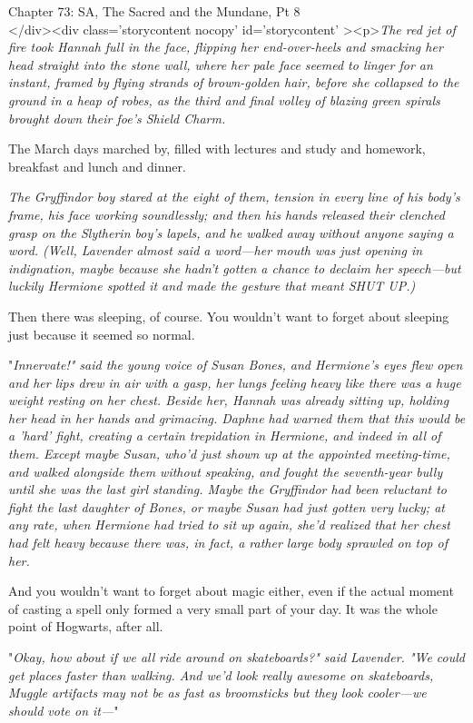 
Chapter 73: SA, The Sacred and the Mundane, Pt 8\\
</div><div  class='storycontent nocopy' id='storycontent' ><p>\emph{The red jet 
of fire took Hannah full in the face, flipping her end-over-heels and smacking 
her head straight into the stone wall, where her pale face seemed to linger for 
an instant, framed by flying strands of brown-golden hair, before she collapsed 
to the ground in a heap of robes, as the third and final volley of blazing 
green spirals brought down their foe's Shield Charm.}

The March days marched by, filled with lectures and study and homework, 
breakfast and lunch and dinner.

\emph{The Gryffindor boy stared at the eight of them, tension in every line of 
his body's frame, his face working soundlessly; and then his hands released 
their clenched grasp on the Slytherin boy's lapels, and he walked away without 
anyone saying a word. (Well, Lavender almost said a word---her mouth was just 
opening in indignation, maybe because she hadn't gotten a chance to declaim her 
speech---but luckily Hermione spotted it and made the gesture that meant SHUT 
UP.)}

Then there was sleeping, of course. You wouldn't want to forget about sleeping 
just because it seemed so normal.

"\emph{Innervate!" said the young voice of Susan Bones, and Hermione's eyes 
flew open and her lips drew in air with a gasp, her lungs feeling heavy like 
there was a huge weight resting on her chest. Beside her, Hannah was already 
sitting up, holding her head in her hands and grimacing. Daphne had warned them 
that this would be a 'hard' fight, creating a certain trepidation in Hermione, 
and indeed in all of them. Except maybe Susan, who'd just shown up at the 
appointed meeting-time, and walked alongside them without speaking, and fought 
the seventh-year bully until she was the last girl standing. Maybe the 
Gryffindor had been reluctant to fight the last daughter of Bones, or maybe 
Susan had just gotten very lucky; at any rate, when Hermione had tried to sit 
up again, she'd realized that her chest had felt heavy because there was, in 
fact, a rather large body sprawled on top of her.}

And you wouldn't want to forget about magic either, even if the actual moment 
of casting a spell only formed a very small part of your day. It was the whole 
point of Hogwarts, after all.

"\emph{Okay, how about if we all ride around on skateboards?" said Lavender. 
"We could get places faster than walking. And we'd look really awesome on 
skateboards, Muggle artifacts may not be as fast as broomsticks but they look 
cooler---we should vote on it---}"

